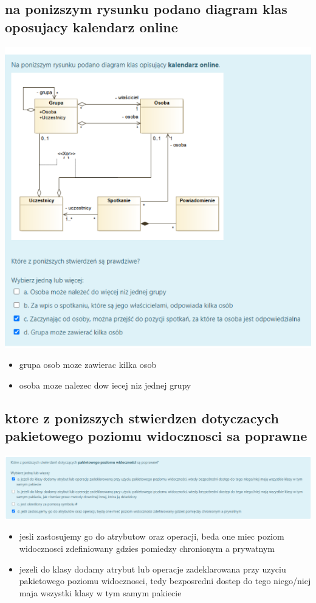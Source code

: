 \documentclass[11pt]{article}
\begin{document}
\subsection{na ponizszym rysunku podano diagram klas oposujacy kalendarz online}
\label{sec:orgd8212e3}
\begin{center}
\includegraphics[width=.9\linewidth]{./zadanie6.png}
\end{center}
\begin{itemize}
\item grupa osob moze zawierac kilka osob
\item osoba moze nalezec dow iecej niz jednej grupy
\end{itemize}
\subsection{ktore z ponizszych stwierdzen dotyczacych pakietowego poziomu widocznosci sa poprawne}
\label{sec:org3510277}
\begin{center}
\includegraphics[width=.9\linewidth]{./zadanie7.png}
\end{center}
\begin{itemize}
\item jesli zastosujemy go do atrybutow oraz operacji, beda one miec poziom widocznosci zdefiniowany gdzies pomiedzy chronionym a prywatnym
\item jezeli do klasy dodamy atrybut lub operacje zadeklarowana przy uzyciu pakietowego poziomu widocznosci, tedy bezposredni dostep do tego niego/niej maja wszystki klasy w tym samym pakiecie
\end{itemize}
\end{document}
